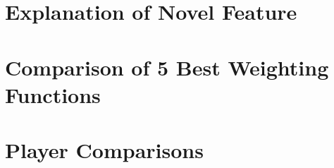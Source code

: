 \documentclass[
	12pt, %
]{fphw}
\begin{document}

\section*{Explanation of Novel Feature}


\section*{Comparison of 5 Best Weighting Functions}


\section*{Player Comparisons}

\begin{problem}
	
\end{problem}
\end{document}
